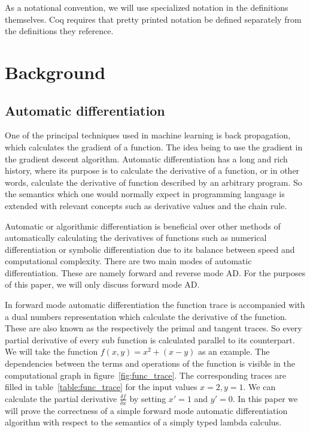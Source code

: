 \documentclass[12pt, final]{article}
\begin{document}

As a notational convention, we will use specialized notation in the definitions themselves. Coq requires that pretty printed notation be defined separately from the definitions they reference.

\section{Background}

\subsection{Automatic differentiation}


One of the principal techniques used in machine learning is back propagation, which calculates the gradient of a function.
The idea being to use the gradient in the gradient descent algorithm\cite{Baydin2015AutomaticDI}.
Automatic differentiation has a long and rich history, where its purpose is to calculate the derivative of a function, or in other words, calculate the derivative of function described by an arbitrary program.
So the semantics which one would normally expect in programming language is extended with relevant concepts such as derivative values and the chain rule.

Automatic or algorithmic differentiation is beneficial over other methods of automatically calculating the derivatives of functions such as numerical differentiation or symbolic differentiation due to its balance between speed and computational complexity.
There are two main modes of automatic differentiation.
These are namely forward and reverse mode AD. For the purposes of this paper, we will only discuss forward mode AD.

In forward mode automatic differentiation the function trace is accompanied with a dual numbers representation which calculate the derivative of the function. These are also known as the respectively the primal and tangent traces. So every partial derivative of every sub function is calculated parallel to its counterpart. We will take the function $f(x, y) = x^2 + (x - y)$ as an example. The dependencies between the terms and operations of the function is visible in the computational graph in figure~\ref{fig:func_trace}. The corresponding traces are filled in table~\ref{table:func_trace} for the input values $x = 2, y = 1$. We can calculate the partial derivative $\frac{\delta f}{\delta x}$ by setting $x' = 1$ and $y' = 0$. In this paper we will prove the correctness of a simple forward mode automatic differentiation algorithm with respect to the semantics of a simply typed lambda calculus.
\end{document}

